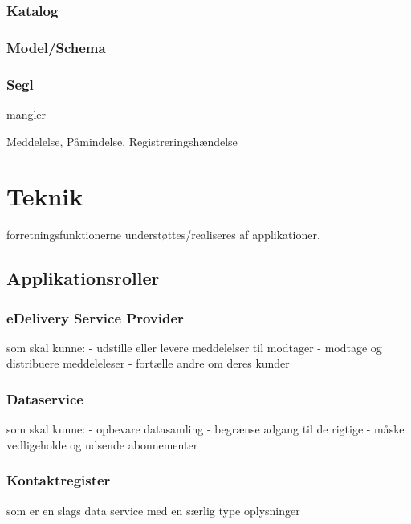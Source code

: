 \subsubsection{Katalog}\label{katalog}

\subsubsection{Model/Schema}\label{modelschema}

\subsubsection{Segl}\label{segl}

mangler

Meddelelse, Påmindelse, Registreringshændelse

\section{Teknik}\label{teknik}

forretningsfunktionerne understøttes/realiseres af applikationer.

\subsection{Applikationsroller}\label{applikationsroller}

\subsubsection{eDelivery Service
Provider}\label{edelivery-service-provider}

som skal kunne: - udstille eller levere meddelelser til modtager -
modtage og distribuere meddeleleser - fortælle andre om deres kunder

\subsubsection{Dataservice}\label{dataservice}

som skal kunne: - opbevare datasamling - begrænse adgang til de rigtige
- måske vedligeholde og udsende abonnementer

\subsubsection{Kontaktregister}\label{kontaktregister}

som er en slags data service med en særlig type oplysninger

